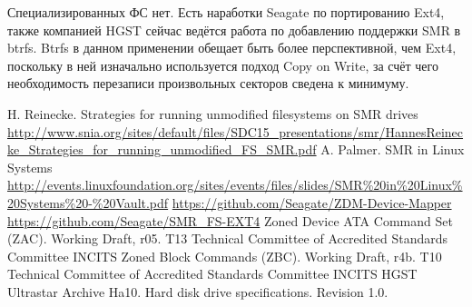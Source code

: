 \documentclass[10pt, a5paper]{article}
\begin{document}
Специализированных ФС нет. Есть наработки Seagate по портированию Ext4, также компанией HGST сейчас ведётся работа по добавлению поддержки SMR в btrfs. Btrfs в данном применении обещает быть более перспективной, чем Ext4, поскольку в ней изначально используется подход Copy on Write, за счёт чего необходимость перезаписи произвольных секторов сведена к минимуму.

\begin{thebibliography}{99}
   H. Reinecke. Strategies for running unmodified filesystems on SMR drives \url{http://www.snia.org/sites/default/files/SDC15_presentations/smr/HannesReinecke_Strategies_for_running_unmodified_FS_SMR.pdf}
   A. Palmer. SMR in Linux Systems \url{http://events.linuxfoundation.org/sites/events/files/slides/SMR\%20in\%20Linux\%20Systems\%20-\%20Vault.pdf}
   \url{https://github.com/Seagate/ZDM-Device-Mapper}
   \url{https://github.com/Seagate/SMR\_FS-EXT4}
   Zoned Device ATA Command Set (ZAC). Working Draft, r05. T13 Technical Committee of Accredited Standards Committee INCITS
   Zoned Block Commands (ZBC). Working Draft, r4b. T10 Technical Committee of Accredited Standards Committee INCITS
   HGST Ultrastar Archive Ha10. Hard disk drive specifications. Revision 1.0.
\end{thebibliography}
\end{document}

